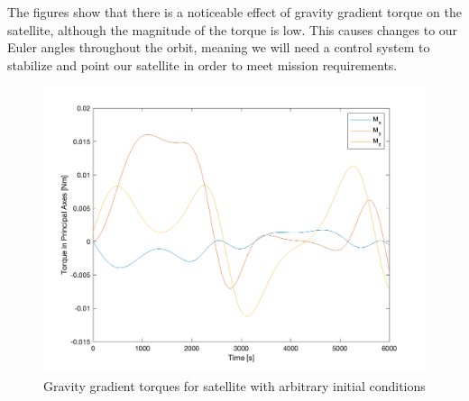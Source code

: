 The figures show that there is a noticeable effect of gravity gradient torque on the satellite, although the magnitude of the torque is low. This causes changes to our Euler angles throughout the orbit, meaning we will need a control system to stabilize and point our satellite in order to meet mission requirements.

\begin{figure}[H]
\centering
\includegraphics[scale=0.6]{Images/ps4_problem4e_torque.png}
\caption{Gravity gradient torques for satellite with arbitrary initial conditions}
\label{fig:ps4_problem4e_torque}
\end{figure}